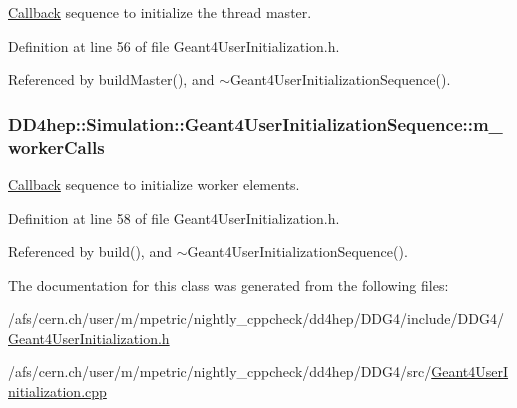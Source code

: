 \hyperlink{class_d_d4hep_1_1_callback}{Callback} sequence to initialize the thread master. 

Definition at line 56 of file Geant4UserInitialization.h.

Referenced by buildMaster(), and $\sim$Geant4UserInitializationSequence().\hypertarget{class_d_d4hep_1_1_simulation_1_1_geant4_user_initialization_sequence_a85de09bfc3a69485391fb549a457cf7e}{
\subsubsection[{m\_\-workerCalls}]{ {\bf DD4hep::Simulation::Geant4UserInitializationSequence::m\_\-workerCalls}}}
\label{class_d_d4hep_1_1_simulation_1_1_geant4_user_initialization_sequence_a85de09bfc3a69485391fb549a457cf7e}


\hyperlink{class_d_d4hep_1_1_callback}{Callback} sequence to initialize worker elements. 

Definition at line 58 of file Geant4UserInitialization.h.

Referenced by build(), and $\sim$Geant4UserInitializationSequence().

The documentation for this class was generated from the following files:\begin{DoxyCompactItemize}
\item 
/afs/cern.ch/user/m/mpetric/nightly\_\-cppcheck/dd4hep/DDG4/include/DDG4/\hyperlink{_geant4_user_initialization_8h}{Geant4UserInitialization.h}\item 
/afs/cern.ch/user/m/mpetric/nightly\_\-cppcheck/dd4hep/DDG4/src/\hyperlink{_geant4_user_initialization_8cpp}{Geant4UserInitialization.cpp}\end{DoxyCompactItemize}
